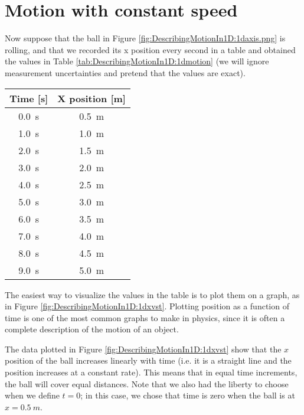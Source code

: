 \section{Motion with constant speed}
Now suppose that the ball in Figure \ref{fig:DescribingMotionIn1D:1daxis.png} is rolling, and that we recorded its x position every second in a table and obtained the values in Table \ref{tab:DescribingMotionIn1D:1dmotion} (we will ignore measurement uncertainties and pretend that the values are exact).
\begin{center}
\begingroup
\renewcommand{\arraystretch}{1.0}
\begin{tabular}{cc}
\textbf{Time [s]}&\textbf{X position [m]}\\
\hline
\hline
\SI{0.0}{s}& \SI{0.5}{m}\\ \hline
\SI{1.0}{s}& \SI{1.0}{m}\\ \hline
\SI{2.0}{s}& \SI{1.5}{m}\\ \hline
\SI{3.0}{s}& \SI{2.0}{m}\\ \hline
\SI{4.0}{s}& \SI{2.5}{m}\\ \hline
\SI{5.0}{s}& \SI{3.0}{m}\\ \hline
\SI{6.0}{s}& \SI{3.5}{m}\\ \hline
\SI{7.0}{s}& \SI{4.0}{m}\\ \hline
\SI{8.0}{s}& \SI{4.5}{m}\\ \hline
\SI{9.0}{s}& \SI{5.0}{m}\\ \hline
\end{tabular}
\endgroup
\end{center}
The easiest way to visualize the values in the table is to plot them on a graph, as in Figure \ref{fig:DescribingMotionIn1D:1dxvst}. Plotting position as a function of time is one of the most common graphs to make in physics, since it is often a complete description of the motion of an object. 

The data plotted in Figure \ref{fig:DescribingMotionIn1D:1dxvst} show that the $x$ position of the ball increases linearly with time (i.e. it is a straight line and the position increases at a constant rate). This means that in equal time increments, the ball will cover equal distances. Note that we also had the liberty to choose when we define $t=0$; in this case, we chose that time is zero when the ball is at $x=\SI{0.5}{m}$. 

